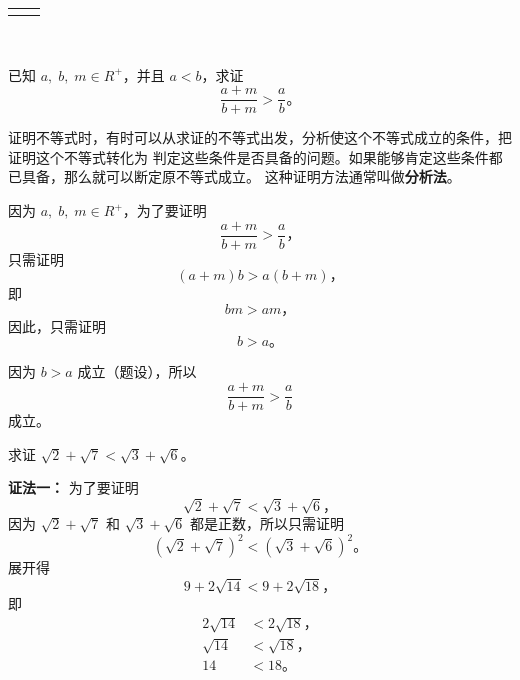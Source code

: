 \lianxi
\begin{xiaotis}
\setcounter{cntxiaoti}{0}

\begin{xiaoxiaotis}



\end{xiaoxiaotis}

\begin{xiaoxiaotis}

    \renewcommand\arraystretch{1.5}
    \begin{tabular}[t]{*{2}{@{}p{16em}}}
         & 
    \end{tabular}

\end{xiaoxiaotis}



\end{xiaotis}

\,

\liti 已知 $a,\; b,\; m \in R^+$，并且 $a < b$，求证
$$ \dfrac{a + m}{b + m} > \dfrac{a}{b} \text{。} $$

证明不等式时，有时可以从求证的不等式出发，分析使这个不等式成立的条件，把证明这个不等式转化为
判定这些条件是否具备的问题。如果能够肯定这些条件都已具备，那么就可以断定原不等式成立。
这种证明方法通常叫做\textbf{分析法}。

\zhengming 因为 $a,\; b,\; m \in R^+$，为了要证明
$$ \dfrac{a + m}{b + m} > \dfrac{a}{b} \text{，} $$
只需证明
$$ (a + m)b > a(b + m) \text{，} $$
即
$$ bm > am \text{，} $$
因此，只需证明
$$ b > a \text{。} $$

因为 $b > a$ 成立（题设），所以
$$ \dfrac{a + m}{b + m} > \dfrac{a}{b} $$
成立。

\liti 求证 $\sqrt{2} + \sqrt{7} < \sqrt{3} + \sqrt{6}$。

\textbf{证法一：} 为了要证明
$$ \sqrt{2} + \sqrt{7} < \sqrt{3} + \sqrt{6} \text{，} $$
因为 $\sqrt{2} + \sqrt{7}$ 和 $\sqrt{3} + \sqrt{6}$ 都是正数，所以只需证明
$$ (\sqrt{2} + \sqrt{7})^2 < (\sqrt{3} + \sqrt{6})^2 \text{。} $$
展开得
$$ 9 + 2\sqrt{14} < 9 + 2\sqrt{18} \text{，} $$
即
\begin{align*}
    2\sqrt{14} &< 2\sqrt{18} \text{，}  \\
     \sqrt{14} &< \sqrt{18} \text{，}  \\
           14  &< 18 \text{。}
\end{align*}

